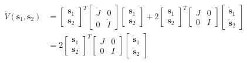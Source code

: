 \color{blue} %
\begin{equation}
\begin{aligned}
\dot{V}({\boldsymbol s}_1, {\boldsymbol s}_2) & = 
\begin{bmatrix}
{\boldsymbol s}_1 \\
{\boldsymbol s}_2
\end{bmatrix} ^{T}
\begin{bmatrix}
\dot{J} & 0 \\
0 & \dot{I}
\end{bmatrix}
\begin{bmatrix}
{\boldsymbol s}_1 \\
{\boldsymbol s}_2
\end{bmatrix}
+ 2
\begin{bmatrix}
{\boldsymbol s}_1 \\
{\boldsymbol s}_2
\end{bmatrix} ^{T}
\begin{bmatrix}
J & 0 \\
0 & I
\end{bmatrix}
\begin{bmatrix}
\dot{\boldsymbol s}_1 \\
\dot{\boldsymbol s}_2
\end{bmatrix} \\
& = 
2
\begin{bmatrix}
{\boldsymbol s}_1 \\
{\boldsymbol s}_2
\end{bmatrix} ^{T}
\begin{bmatrix}
J & 0 \\
0 & I
\end{bmatrix}
\begin{bmatrix}
\dot{\boldsymbol s}_1 \\
\dot{\boldsymbol s}_2
\end{bmatrix} \\

\end{aligned}
\end{equation}
